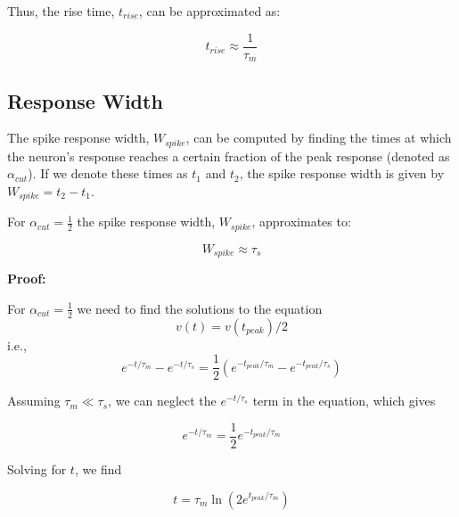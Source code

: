 Thus, the rise time, $t_{rise}$, can be approximated as:

\begin{equation}
t_{rise} \approx \frac{1}{\tau_m}
\end{equation}

\subsection{Response Width}

The spike response width, $W_{spike}$, can be computed by finding the times at which the neuron's response reaches a certain fraction of the peak response (denoted as $\alpha_{cut}$). If we denote these times as $t_1$ and $t_2$, the spike response width is given by $W_{spike} = t_2 - t_1$.

\begin{mdframed}[backgroundcolor=red_background, linecolor=black, linewidth=2pt, frametitle=\textbf{Statement}]
\begin{center}

    \label{st:window-width}
    For $\alpha_{cut} = \frac{1}{2}$ the spike response width, $W_{spike}$, approximates to:

    \begin{equation}
        W_{spike} \approx \tau_s
    \end{equation}

\end{center}
\end{mdframed}


\textbf{Proof:}

For $\alpha_{cut} = \frac{1}{2}$ we need to find the solutions to the equation
\begin{equation}
    v(t) = v(t_{peak})/2
\end{equation}
i.e.,
\begin{equation}
e^{-t/\tau_m} - e^{-t/\tau_s} = \frac{1}{2}\left(e^{-t_{peak}/\tau_m} - e^{-t_{peak}/\tau_s}\right)
\end{equation}

Assuming $\tau_m \ll \tau_s$, we can neglect the $e^{-t/\tau_s}$ term in the equation, which gives

\begin{equation}
e^{-t/\tau_m} = \frac{1}{2} e^{-t_{peak}/\tau_m}
\end{equation}

Solving for $t$, we find

\begin{equation}
t = \tau_m \ln\left(2 e^{t_{peak}/\tau_m}\right)
\end{equation}

